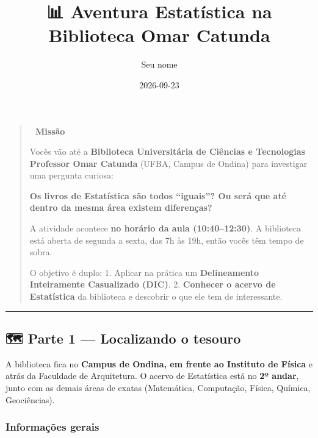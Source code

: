 \documentclass[
]{article}
\title{📊 Aventura Estatística na Biblioteca Omar Catunda}
\author{Seu nome}
\date{2026-09-23}
\begin{document}
\maketitle

{
\setcounter{tocdepth}{2}
\tableofcontents
}
\begin{quote}
\textbf{🎯 Missão}

Vocês vão até a \textbf{Biblioteca Universitária de Ciências e
Tecnologias Professor Omar Catunda} (UFBA, Campus de Ondina) para
investigar uma pergunta curiosa:

\textbf{Os livros de Estatística são todos ``iguais''? Ou será que até
dentro da mesma área existem diferenças?}

A atividade acontece \textbf{no horário da aula (10:40--12:30)}. A
biblioteca está aberta de segunda a sexta, das 7h às 19h, então vocês
têm tempo de sobra.

O objetivo é duplo: 1. Aplicar na prática um \textbf{Delineamento
Inteiramente Casualizado (DIC)}. 2. \textbf{Conhecer o acervo de
Estatística} da biblioteca e descobrir o que ele tem de interessante.
\end{quote}

\begin{center}\rule{0.5\linewidth}{0.5pt}\end{center}

\subsection{🗺️ Parte 1 --- Localizando o
tesouro}\label{parte-1-localizando-o-tesouro}

A biblioteca fica no \textbf{Campus de Ondina, em frente ao Instituto de
Física} e atrás da Faculdade de Arquitetura. O acervo de Estatística
está no \textbf{2º andar}, junto com as demais áreas de exatas
(Matemática, Computação, Física, Química, Geociências).

\subsubsection{Informações gerais}\label{informauxe7uxf5es-gerais}
\end{document}
